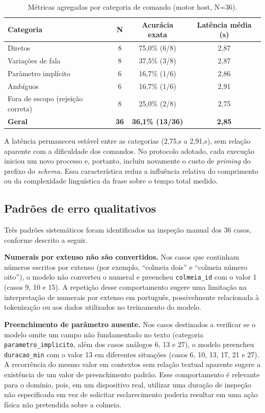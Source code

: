 \documentclass[12pt]{article}
\begin{document}
\begin{table}[h]
\centering
\caption{Métricas agregadas por categoria de comando (motor host, N=36).}
\label{tab:metricas}
\begin{tabular}{lccc}
\toprule
Categoria & N & Acurácia exata & Latência média (s) \\
\midrule
Diretos              & 8 & 75,0\% (6/8)  & 2,87 \\
Variações de fala     & 8 & 37,5\% (3/8)  & 2,87 \\
Parâmetro implícito   & 6 & 16,7\% (1/6)  & 2,86 \\
Ambíguos              & 6 & 16,7\% (1/6)  & 2,91 \\
Fora de escopo (rejeição correta) & 8 & 25,0\% (2/8) & 2,75 \\
\midrule
\textbf{Geral}        & \textbf{36} & \textbf{36,1\% (13/36)} & \textbf{2,85} \\
\bottomrule
\end{tabular}
\end{table}

A latência permaneceu estável entre as categorias (2,75,s a 2,91,s), sem
relação aparente com a dificuldade dos comandos. No protocolo adotado,
cada execução iniciou um novo processo e, portanto, incluiu novamente o
custo de \textit{priming} do prefixo do \textit{schema}. Essa
característica reduz a influência relativa do comprimento ou da
complexidade linguística da frase sobre o tempo total medido.


\subsection{Padrões de erro qualitativos}

Três padrões sistemáticos foram identificados na inspeção manual dos 36 casos, conforme descrito a seguir.

\textbf{Numerais por extenso não são convertidos.} Nos casos que continham números escritos por extenso (por exemplo, ``colmeia dois'' e ``colmeia número oito''), o modelo não converteu o numeral e preencheu \texttt{colmeia\_id} com o valor 1 (casos 9, 10 e 15). A repetição desse comportamento sugere uma limitação na interpretação de numerais por extenso em português, possivelmente relacionada à tokenização ou aos dados utilizados no treinamento do modelo.

\textbf{Preenchimento de parâmetro ausente.} Nos casos destinados a verificar se o modelo omite um campo não fundamentado no texto (categoria \texttt{parametro\_implicito}, além dos casos análogos 6, 13 e 27), o modelo preencheu \texttt{duracao\_min} com o valor 13 em diferentes situações (casos 6, 10, 13, 17, 21 e 27). A recorrência do mesmo valor em contextos sem relação textual aparente sugere a existência de um valor de preenchimento padrão. Esse comportamento é relevante para o domínio, pois, em um dispositivo real, utilizar uma duração de inspeção não especificada em vez de solicitar esclarecimento poderia resultar em uma ação física não pretendida sobre a colmeia.
\end{document}
